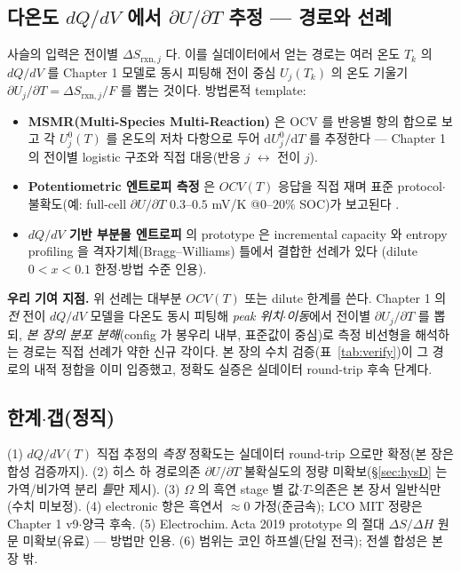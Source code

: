 \documentclass[11pt,a4paper]{article}
\newcommand{\dd}{\mathrm{d}}
\newcommand{\rxn}{\mathrm{rxn}}
\begin{document}
\subsection{다온도 $dQ/dV$ 에서 $\partial U/\partial T$ 추정 — 경로와 선례}\label{sec:estimate}
사슬의 입력은 전이별 $\Delta S_{\rxn,j}$ 다. 이를 실데이터에서 얻는 경로는 여러 온도 $T_k$ 의 $dQ/dV$ 를
Chapter 1 모델로 동시 피팅해 전이 중심 $U_j(T_k)$ 의 온도 기울기 $\partial U_j/\partial T=\Delta S_{\rxn,j}/F$
를 뽑는 것이다. 방법론적 template:
\begin{itemize}[leftmargin=1.5em,itemsep=2pt]
\item \textbf{MSMR(Multi-Species Multi-Reaction)} 은 OCV 를 반응별 항의 합으로 보고 각 $U_j^0(T)$ 를
온도의 저차 다항으로 두어 $\dd U_j^0/\dd T$ 를 추정한다 \cite{msmr_partI,msmr_partII} — Chapter 1 의 전이별
logistic 구조와 직접 대응(반응 $j$ $\leftrightarrow$ 전이 $j$).
\item \textbf{Potentiometric 엔트로피 측정} 은 $OCV(T)$ 응답을 직접 재며 표준 protocol$\cdot$불확도(예: full-cell
$\partial U/\partial T$ $0.3$--$0.5$ mV/K @$0$--$20\%$ SOC)가 보고된다 \cite{standardised2024}.
\item \textbf{$dQ/dV$ 기반 부분몰 엔트로피} 의 prototype 은 incremental capacity 와 entropy profiling 을
격자기체(Bragg--Williams) 틀에서 결합한 선례가 있다 \cite{occupation2019}(dilute $0<x<0.1$ 한정$\cdot$방법
수준 인용).
\end{itemize}
\textbf{우리 기여 지점.} 위 선례는 대부분 $OCV(T)$ 또는 dilute 한계를 쓴다. Chapter 1 의 \emph{전} 전이
$dQ/dV$ 모델을 다온도 동시 피팅해 \emph{peak 위치$\cdot$이동}에서 전이별 $\partial U_j/\partial T$ 를 뽑되,
\emph{본 장의 분포 분해}(config 가 봉우리 내부, 표준값이 중심)로 측정 비선형을 해석하는 경로는 직접 선례가
약한 신규 각이다. 본 장의 수치 검증(표~\ref{tab:verify})이 그 경로의 내적 정합을 이미 입증했고, 정확도
실증은 실데이터 round-trip 후속 단계다.

\subsection{한계$\cdot$갭(정직)}\label{sec:limits}
(1) $dQ/dV(T)$ 직접 추정의 \emph{측정} 정확도는 실데이터 round-trip 으로만 확정(본 장은 합성 검증까지).
(2) 히스 하 경로의존 $\partial U/\partial T$ 불확실도의 정량 미확보(\S\ref{sec:hysD} 는 가역/비가역 분리
\emph{틀}만 제시). (3) $\Omega$ 의 흑연 stage 별 값$\cdot$$T$-의존은 본 장서 일반식만(수치 미보정).
(4) electronic 항은 흑연서 $\approx0$ 가정(준금속); LCO MIT 정량은 Chapter 1 v9$\cdot$양극 후속.
(5) Electrochim.\,Acta 2019 prototype 의 절대 $\Delta S/\Delta H$ 원문 미확보(유료) — 방법만 인용.
(6) 범위는 코인 하프셀(단일 전극); 전셀 합성은 본 장 밖.
\end{document}
